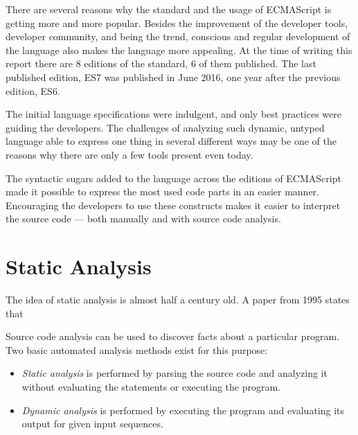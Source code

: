 There are several reasons why the standard and the usage of ECMAScript is getting more and more popular. Besides the improvement of the developer tools, developer community, and being the trend, conscious and regular development of the language also makes the language more appealing. At the time of writing this report there are 8 editions of the standard, 6 of them published. The last published edition, ES7 was published in June 2016, one year after the previous edition, ES6.

The initial language specifications were indulgent, and only best practices were guiding the developers. The challenges of analyzing such dynamic, untyped language able to express one thing in several different ways may be one of the reasons why there are only a few tools present even today.

The syntactic sugars added to the language across the editions of ECMAScript made it possible to express the most used code parts in an easier manner. Encouraging the developers to use these constructs makes it easier to interpret the source code --- both manually and with source code analysis.



\section{Static Analysis}
The idea of static analysis is almost half a century old. A paper from 1995 states that 

Source code analysis can be used to discover facts about a particular program. Two basic automated analysis methods exist for this purpose:
\begin{itemize}[topsep=0pt]
  \item \emph{Static analysis} is performed by parsing the source code and analyzing it without evaluating the statements or executing the program.
  \item \emph{Dynamic analysis} is performed by executing the program and evaluating its output for given input sequences.
\end{itemize}

